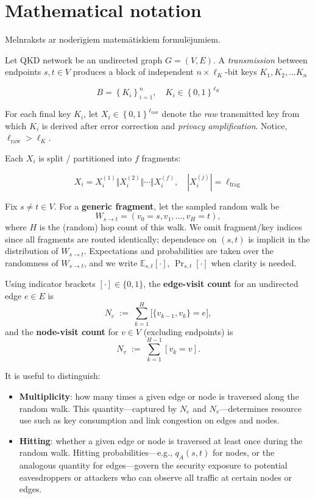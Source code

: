\documentclass[journal]{IEEEtran}
\newcommand\draft[1]{\textcolor{RedOrange}{#1}}
\begin{document}
\section{Mathematical notation}

\draft{Melnraksts ar noderīgiem matemātiskiem formulējumiem.}

Let QKD network be an undirected graph $G=(V,E)$. A \textit{transmission} between endpoints $s,t \in V$ produces a block of independent $n\times \ell_K$-bit keys $K_1, K_2, \ldots K_n$

$$B=\left\{K_i\right\}^n_{i=1}, \quad K_i \in \left\{0,1\right\}^{\ell_K}$$

For each final key $K_i$, let $X_i \in \left\{0,1\right\}^{\ell_\text{raw}}$ denote the \textit{raw} transmitted key from which $K_i$ is derived after error correction and \textit{privacy amplification}. Notice, $\ell_\text{raw} > \ell_K$.

Each $X_i$ is split / partitioned  into $f$ fragments:

$$X_i = X_i^{(1)}\Vert X_i^{(2)}\Vert \cdots \Vert X_i^{(f)},\quad |X_i^{(j)}|=\ell_{\mathrm{frag}}$$

Fix $s\neq t\in V$. For a \textbf{generic fragment}, let the sampled random walk be
$$
W_{s\to t}=(v_0=s, v_1,\ldots,v_H=t),
$$
where $H$ is the (random) hop count of this walk. We omit fragment/key indices since all fragments are routed identically; dependence on $(s,t)$ is implicit in the distribution of $W_{s\to t}$. Expectations and probabilities are taken over the randomness of $W_{s\to t}$, and we write $\mathbb{E}_{s,t}[\cdot]$, $\Pr_{s,t}[\cdot]$ when clarity is needed.

Using indicator brackets $[\cdot]\in\{0,1\}$, the \textbf{edge-visit count} for an undirected edge $e\in E$ is
$$
N_e \;:=\; \sum_{k=1}^{H} \big[\{v_{k-1},v_k\}=e\big],
$$
and the \textbf{node-visit count} for $v\in V$ (excluding endpoints) is
$$
N_v \;:=\; \sum_{k=1}^{H-1} [v_k=v].
$$

It is useful to distinguish:
\begin{itemize}
    \item \textbf{Multiplicity}: how many times a given edge or node is traversed along the random walk. This quantity---captured by $N_e$ and $N_v$---determines resource use such as key consumption and link congestion on edges and nodes.
    \item \textbf{Hitting}: whether a given edge or node is traversed at least once during the random walk. Hitting probabilities---e.g., $q_A(s, t)$ for nodes, or the analogous quantity for edges---govern the security exposure to potential eavesdroppers or attackers who can observe all traffic at certain nodes or edges.
\end{itemize}
\end{document}
